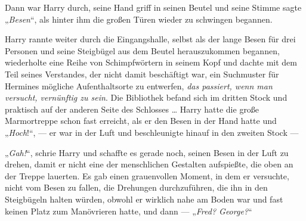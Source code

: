 Dann war Harry durch, seine Hand griff in seinen Beutel und seine Stimme sagte
„\emph{Besen}“, als hinter ihm die großen Türen wieder zu schwingen begannen.

Harry rannte weiter durch die Eingangshalle, selbst als der lange Besen für drei Personen und seine Steigbügel aus dem Beutel herauszukommen begannen, wiederholte eine Reihe von Schimpfwörtern in seinem Kopf und dachte mit dem Teil seines Verstandes, der nicht damit beschäftigt war, ein Suchmuster für Hermines mögliche Aufenthaltsorte zu entwerfen, \emph{das passiert, wenn man versucht, vernünftig zu sein}. Die Bibliothek befand sich im dritten Stock und praktisch auf der anderen Seite des Schlosses … Harry hatte die große Marmortreppe schon fast erreicht, als er den Besen in der Hand hatte und
„\emph{Hoch}!“, — er war in der Luft und beschleunigte hinauf in den zweiten Stock —

„\emph{Gah!}“, schrie Harry und schaffte es gerade noch, seinen Besen in der Luft zu drehen, damit er nicht eine der menschlichen Gestalten aufspießte, die oben an der Treppe lauerten. Es gab einen grauenvollen Moment, in dem er versuchte, nicht vom Besen zu fallen, die Drehungen durchzuführen, die ihn in den Steigbügeln halten würden, obwohl er wirklich nahe am Boden war und fast keinen Platz zum Manövrieren hatte, und dann —
„\emph{Fred? George?}“

